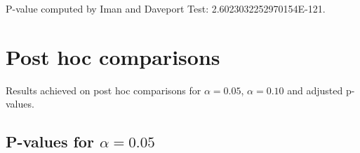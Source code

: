 \documentclass[a4paper,10pt]{article}
\begin{document}
\begin{landscape}
P-value computed by Iman and Daveport Test: 2.6023032252970154E-121.\newline



\pagebreak

\section{Post hoc comparisons}

Results achieved on post hoc comparisons for $\alpha = 0.05$, $\alpha = 0.10$ and adjusted p-values.

\subsection{P-values for $\alpha=0.05$}


\end{landscape}
\end{document}
